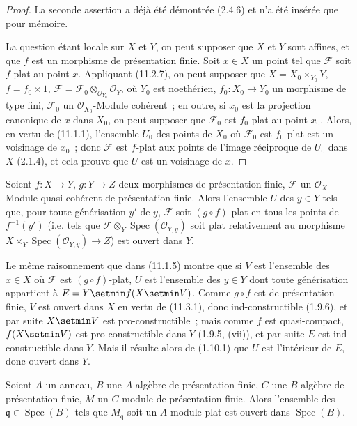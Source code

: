 \begin{proof}
La seconde assertion a déjà été démontrée (2.4.6) et n'a été insérée que pour
mémoire.

La question étant locale sur $X$ et $Y$, on peut supposer que $X$ et $Y$ sont
affines, et que $f$ est un morphisme de présentation finie. Soit $x\in X$ un
point tel que $\mathcal F$ soit $f$-plat au point $x$. Appliquant (11.2.7), on
peut supposer que
$X=X_0\times_{Y_0}Y$, $f=f_0\times1$,
$\mathcal F=\mathcal F_0\otimes_{\mathcal O_{Y_0}}\mathcal O_Y$,
où $Y_0$ est noethérien, $f_0:X_0\to Y_0$ un morphisme de type fini,
$\mathcal F_0$ un $\mathcal O_{X_0}$-Module cohérent~; en outre, si $x_0$ est la
projection canonique de $x$ dans $X_0$, on peut supposer que $\mathcal F_0$ est
$f_0$-plat au point $x_0$. Alors, en vertu de (11.1.1), l'ensemble $U_0$ des
points de $X_0$ où $\mathcal F_0$ est $f_0$-plat est un voisinage de $x_0$~;
donc $\mathcal F$ est $f$-plat aux points de l'image réciproque de $U_0$ dans
$X$ (2.1.4), et cela prouve que $U$ est un voisinage de $x$.
\end{proof}


\begin{corollary}[11.3.2]
\label{IV.11.3.2-fr}
Soient $f:X\to Y$, $g:Y\to Z$ deux morphismes de présentation finie,
$\mathcal F$ un $\mathcal O_X$-Module quasi-cohérent de présentation finie.
Alors l'ensemble $U$ des $y\in Y$ tels que, pour toute générisation $y'$ de
$y$, $\mathcal F$ soit $(g\circ f)$-plat en tous les points de $f^{-1}(y')$
\textup{(i.e.} tels que $\mathcal F\otimes_Y\operatorname{Spec}(\mathcal O_{Y,y})$
soit plat relativement au morphisme
$X\times_Y\operatorname{Spec}(\mathcal O_{Y,y})\to Z$\textup{)} est ouvert dans $Y$.
\end{corollary}

Le même raisonnement que dans (11.1.5) montre que si $V$ est l'ensemble des
$x\in X$ où $\mathcal F$ est $(g\circ f)$-plat, $U$ est l'ensemble des $y\in Y$
dont toute générisation appartient à $E=Y\setmin f(X\setmin V)$. Comme $g\circ f$ est de
présentation finie, $V$ est ouvert dans $X$ en vertu de (11.3.1), donc
ind-constructible (1.9.6), et par suite $X\setmin V$ est pro-constructible~; mais comme
$f$ est quasi-compact, $f(X\setmin V)$ est pro-constructible dans $Y$ (1.9.5, (vii)),
et par suite $E$ est ind-constructible dans $Y$. Mais il résulte alors de
(1.10.1) que $U$ est l'intérieur de $E$, donc ouvert dans $Y$.

\begin{corollary}[11.3.3]
\label{IV.11.3.3-fr}
Soient $A$ un anneau, $B$ une $A$-algèbre de présentation finie, $C$ une
$B$-algèbre de présentation finie, $M$ un $C$-module de présentation finie.
Alors l'ensemble des $\mathfrak q\in\operatorname{Spec}(B)$ tels que
$M_\mathfrak q$ soit un $A$-module plat est ouvert dans
$\operatorname{Spec}(B)$.
\end{corollary}

